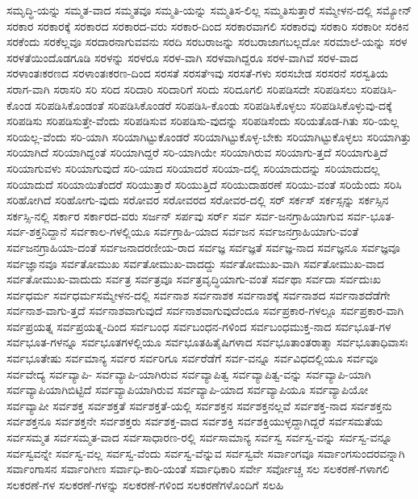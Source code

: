 {ಸಮೃದ್ಧಿ-ಯನ್ನು
ಸಮ್ಮತ-ವಾದ
ಸಮ್ಮತವೂ
ಸಮ್ಮತಿ-ಯನ್ನು
ಸಮ್ಮತಿಸ-ಲಿಲ್ಲ
ಸಮ್ಮತಿಸುತ್ತಾರೆ
ಸಮ್ಮೇಳನ-ದಲ್ಲಿ
ಸಮ್ಯೋನ್
ಸರಕಾರ
ಸರಕಾರಕ್ಕೆ
ಸರಕಾರದ
ಸರಕಾರದ-ವರು
ಸರಕಾರ-ದಿಂದ
ಸರಕಾರವಾಗಲಿ
ಸರಕಾರವು
ಸರಕಾರಿ
ಸರಕಾರೀ
ಸರಕಿನ
ಸರಕೆಂದು
ಸರಕೆಲ್ಲವೂ
ಸರದಾರನಾಗುವವನು
ಸರದಿ
ಸರಬರಾಜನ್ನು
ಸರಬರಾಜಾಗಬಲ್ಲದೋ
ಸರಮಾಲೆ-ಯನ್ನು
ಸರಳ
ಸರಳತೆಯಿಂದೊಡಗೂಡಿ
ಸರಳನ್ನು
ಸರಳರೂ
ಸರಳ-ವಾಗಿ
ಸರಳವಾಗಿದ್ದರೂ
ಸರಳ-ವಾಗಿವೆ
ಸರಳ-ವಾದ
ಸರಳಾಂತಃಕರಣದ
ಸರಳಾಂತಃಕರಣ-ದಿಂದ
ಸರಸತೆ
ಸರಸತೆಇವು
ಸರಸತೆ-ಗಳು
ಸರಸಬೇಡ
ಸರಸರನೆ
ಸರಸ್ವತಿಯ
ಸರಾಗ-ವಾಗಿ
ಸರಾಸರಿ
ಸರಿ
ಸರಿದ
ಸರಿದಾರಿ
ಸರಿದಾರಿಗೆ
ಸರಿದು
ಸರಿದೂಗಲಿ
ಸರಿಪಡಿಸದೇ
ಸರಿಪಡಿಸಲು
ಸರಿಪಡಿಸಿ-ಕೊಂಡ
ಸರಿಪಡಿಸಿಕೊಂಡಂತೆ
ಸರಿಪಡಿಸಿಕೊಂಡರೆ
ಸರಿಪಡಿಸಿ-ಕೊಂಡು
ಸರಿಪಡಿಸಿಕೊಳ್ಳಲು
ಸರಿಪಡಿಸಿಕೊಳ್ಳುವು-ದಕ್ಕೆ
ಸರಿಪಡಿಸು
ಸರಿಪಡಿಸುತ್ತೇ-ವೆಂದು
ಸರಿಪಡಿಸುವ
ಸರಿಪಡಿಸು-ವುದನ್ನು
ಸರಿಪಡಿಸೆಂದು
ಸರಿಯತೊಡ-ಗಿತು
ಸರಿ-ಯಲ್ಲ
ಸರಿಯಲ್ಲ-ವೆಂದು
ಸರಿ-ಯಾಗಿ
ಸರಿಯಾಗಿಟ್ಟುಕೊಂಡರೆ
ಸರಿಯಾಗಿಟ್ಟುಕೊಳ್ಳ-ಬೇಕು
ಸರಿಯಾಗಿಟ್ಟುಕೊಳ್ಳಲು
ಸರಿಯಾಗಿತ್ತು
ಸರಿಯಾಗಿದೆ
ಸರಿಯಾಗಿದ್ದಂತೆ
ಸರಿಯಾಗಿದ್ದರೆ
ಸರಿ-ಯಾಗಿಯೇ
ಸರಿಯಾಗಿರುವ
ಸರಿಯಾಗು-ತ್ತದೆ
ಸರಿಯಾಗುತ್ತಿದೆ
ಸರಿಯಾಗುವಳು
ಸರಿಯಾಗುವುದೆ
ಸರಿ-ಯಾದ
ಸರಿಯಾದರೆ
ಸರಿಯಾ-ದಲ್ಲಿ
ಸರಿಯಾದುದನ್ನು
ಸರಿಯಾದುದಲ್ಲ
ಸರಿಯಾದುದೆ
ಸರಿಯಾಯಿತೆಂದರೆ
ಸರಿಯುತ್ತಾರೆ
ಸರಿಯುತ್ತಿದೆ
ಸರಿಯುದಾಹರಣೆ
ಸರಿಯು-ವಂತೆ
ಸರಿಯೆಂದು
ಸರಿಸಿ
ಸರಿಹೋಗಿದೆ
ಸರಿಹೋಗು-ವುದು
ಸರೋವರ
ಸರೋವರದ
ಸರೋವರ-ದಲ್ಲಿ
ಸರ್
ಸರ್ಕಸ್
ಸರ್ಕಸ್ಸನ್ನು
ಸರ್ಕಸ್ಸಿನ
ಸರ್ಕಸ್ಸಿ-ನಲ್ಲಿ
ಸರ್ಕಾರ
ಸರ್ಕಾರದ-ವರು
ಸರ್ಜನ್
ಸರ್ಪವು
ಸರ್ರ್
ಸರ್ವ
ಸರ್ವ-ಜನಗ್ರಾಹಿಯಾಗುವ
ಸರ್ವ-ಭೂತ-
ಸರ್ವ-ಶಕ್ತನಿದ್ದಾನೆ
ಸರ್ವಕಾಲ-ಗಳಲ್ಲಿಯೂ
ಸರ್ವಗ್ರಾಹಿ-ಯಾದ
ಸರ್ವಜನ
ಸರ್ವಜನಗ್ರಾಹಿಯಾಗು-ವಂತೆ
ಸರ್ವಜನಗ್ರಾಹಿಯಾ-ದಂತೆ
ಸರ್ವಜನಾದರಣೀಯ-ರಾದ
ಸರ್ವಜ್ಞ
ಸರ್ವಜ್ಞತೆ
ಸರ್ವಜ್ಞ-ನಾದ
ಸರ್ವಜ್ಞನೂ
ಸರ್ವಜ್ಞವೂ
ಸರ್ವಜ್ಞಾನವೂ
ಸರ್ವತೋಮುಖ
ಸರ್ವತೋಮುಖ-ವಾದದ್ದು
ಸರ್ವತೋಮುಖ-ವಾಗಿ
ಸರ್ವತೋಮುಖ-ವಾದ
ಸರ್ವತೋಮುಖ-ವಾದುದು
ಸರ್ವತ್ರ
ಸರ್ವತ್ರವೂ
ಸರ್ವತ್ರವೃದ್ಧಿಯಾಗು-ವಂತೆ
ಸರ್ವಥಾ
ಸರ್ವದಾ
ಸರ್ವದುಃಖ
ಸರ್ವಧರ್ಮ
ಸರ್ವಧರ್ಮಸಮ್ಮೇಳನ-ದಲ್ಲಿ
ಸರ್ವನಾಶ
ಸರ್ವನಾಶಕ
ಸರ್ವನಾಶಕ್ಕೆ
ಸರ್ವನಾಶದ
ಸರ್ವನಾಶದೆಡೆಗೇ
ಸರ್ವನಾಶ-ವಾಗು-ತ್ತದೆ
ಸರ್ವನಾಶವಾಗುವುದೆ
ಸರ್ವನಾಶವಾಗುವುದೆಂದೂ
ಸರ್ವಪ್ರಕಾರ-ಗಳಲ್ಲೂ
ಸರ್ವಪ್ರಕಾರ-ವಾಗಿ
ಸರ್ವಪ್ರಯತ್ನ
ಸರ್ವಪ್ರಯತ್ನ-ದಿಂದ
ಸರ್ವಬಂಧ
ಸರ್ವಬಂಧನ-ಗಳಿಂದ
ಸರ್ವಬಂಧಮುಕ್ತ-ನಾದ
ಸರ್ವಭೂತ-ಗಳ
ಸರ್ವಭೂತ-ಗಳನ್ನೂ
ಸರ್ವಭೂತಗಳಲ್ಲಿಯೂ
ಸರ್ವಭೂತಹಿತೈಷಿಗಳಾದ
ಸರ್ವಭೂತಾಂತರಾತ್ಮಾ
ಸರ್ವಭೂತಾಧಿವಾಸಃ
ಸರ್ವಭೂತೇಷು
ಸರ್ವಮಾನ್ಯ
ಸರ್ವರ
ಸರ್ವರಿಗೂ
ಸರ್ವರೆಡೆಗೆ
ಸರ್ವ-ವನ್ನೂ
ಸರ್ವವಿಧದಲ್ಲಿಯೂ
ಸರ್ವವೂ
ಸರ್ವವೇದ್ಯ
ಸರ್ವವ್ಯಾಪಿ-
ಸರ್ವವ್ಯಾಪಿ-ಯಾಗಿರುವ
ಸರ್ವವ್ಯಾಪಿತ್ವ
ಸರ್ವವ್ಯಾಪಿತ್ವ-ವನ್ನು
ಸರ್ವವ್ಯಾಪಿ-ಯಾಗಿ
ಸರ್ವವ್ಯಾಪಿಯಾಗಿಬಿಟ್ಟಿದೆ
ಸರ್ವವ್ಯಾಪಿಯಾಗಿರುವ
ಸರ್ವವ್ಯಾಪಿ-ಯಾದ
ಸರ್ವವ್ಯಾಪಿಯೂ
ಸರ್ವವ್ಯಾಪಿಯೋ
ಸರ್ವವ್ಯಾಪೀ
ಸರ್ವಶಕ್ತ
ಸರ್ವಶಕ್ತತೆ
ಸರ್ವಶಕ್ತತೆ-ಯಲ್ಲಿ
ಸರ್ವಶಕ್ತನ
ಸರ್ವಶಕ್ತನಲ್ಲವೆ
ಸರ್ವಶಕ್ತ-ನಾದ
ಸರ್ವಶಕ್ತನು
ಸರ್ವಶಕ್ತನೂ
ಸರ್ವಶಕ್ತನೇ
ಸರ್ವಶಕ್ತರು
ಸರ್ವಶಕ್ತ-ವಾದ
ಸರ್ವಶಕ್ತಿ
ಸರ್ವಶಕ್ತಿಯುಳ್ಳದ್ದಾಗಿದ್ದರೆ
ಸರ್ವಸಮತೆಯ
ಸರ್ವಸಮ್ಮತ
ಸರ್ವಸಮ್ಮತ-ವಾದ
ಸರ್ವಸಾಧಾರಣ-ರಲ್ಲಿ
ಸರ್ವಸಾಮಾನ್ಯ
ಸರ್ವಸ್ವ
ಸರ್ವಸ್ವ-ವನ್ನು
ಸರ್ವಸ್ವ-ವನ್ನೂ
ಸರ್ವಸ್ವವನ್ನೇ
ಸರ್ವಸ್ವ-ವಲ್ಲ
ಸರ್ವಸ್ವ-ವೆಂದು
ಸರ್ವಸ್ವ-ವೆನ್ನುವ
ಸರ್ವಸ್ವವೇ
ಸರ್ವಾಂಗವೂ
ಸರ್ವಾಂಗಸುಂದರವನ್ನಾಗಿ
ಸರ್ವಾಂಗಾಸನ
ಸರ್ವಾಂಗೀಣ
ಸರ್ವಾಧಿ-ಕಾರಿ-ಯಂತೆ
ಸರ್ವಾಧಿಕಾರಿ
ಸರ್ವೇ
ಸರ್ವೋಚ್ಚ
ಸಲ
ಸಲಕರಣೆ-ಗಳಾಗಲಿ
ಸಲಕರಣೆ-ಗಳ
ಸಲಕರಣೆ-ಗಳನ್ನು
ಸಲಕರಣೆ-ಗಳಿಂದ
ಸಲಕರಣೆಗಳೊಂದಿಗೆ
ಸಲಹಿ
}
